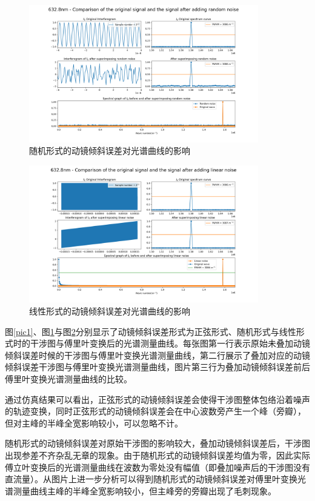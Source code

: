 \documentclass[conference]{IEEEtran}
\begin{document}
\begin{figure}[htbp]
	\centerline{
		\includegraphics[width=10cm]{2.png} 	
	}
	\caption{随机形式的动镜倾斜误差对光谱曲线的影响}
	\label{pic2}
\end{figure}

\begin{figure}[htbp]
	\centerline{
		\includegraphics[width=10cm]{3.png} 	
	}
	\caption{线性形式的动镜倾斜误差对光谱曲线的影响}
	\label{pic3}
\end{figure}

图\ref{pic1}、图\ref{pic2}与图\ref{pic3}分别显示了动镜倾斜误差形式为正弦形式、随机形式与线性形式时的干涉图与傅里叶变换后的光谱测量曲线。每张图第一行表示原始未叠加动镜倾斜误差时候的干涉图与傅里叶变换光谱测量曲线，第二行展示了叠加对应的动镜倾斜误差干涉图与傅里叶变换光谱测量曲线，图片第三行为叠加动镜倾斜误差前后傅里叶变换光谱测量曲线的比较。

通过仿真结果可以看出，正弦形式的动镜倾斜误差会使得干涉图整体包络沿着噪声的轨迹变换，同时正弦形式的动镜倾斜误差会在中心波数旁产生一个峰（旁瓣），但对主峰的半峰全宽影响较小，可以忽略不计。

随机形式的动镜倾斜误差对原始干涉图的影响较大，叠加动镜倾斜误差后，干涉图出现参差不齐杂乱无章的现象。由于随机形式的动镜倾斜误差均值为零，因此实际傅立叶变换后的光谱测量曲线在波数为零处没有幅值（即叠加噪声后的干涉图没有直流量）。从图片上进一步分析可以得到随机形式的动镜倾斜误差对傅里叶变换光谱测量曲线主峰的半峰全宽影响较小，但主峰旁的旁瓣出现了毛刺现象。
\end{document}
